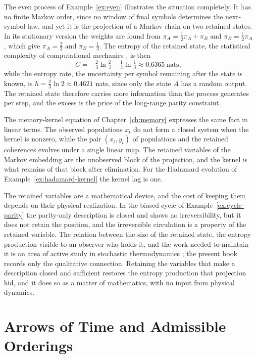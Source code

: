 \documentclass[11pt,oneside]{book}
\theoremstyle{definition}
\theoremstyle{remark}
\begin{document}
The even process of Example~\ref{ex:even} illustrates the situation completely. It has no finite Markov order, since no window of final symbols determines the next-symbol law, and yet it is the projection of a Markov chain on two retained states. In its stationary version the weights are found from $\pi_A=\tfrac12\pi_A+\pi_B$ and $\pi_B=\tfrac12\pi_A$, which give $\pi_A=\tfrac23$ and $\pi_B=\tfrac13$. The entropy of the retained state, the statistical complexity of computational mechanics \cite{crutchfield1989,shalizi2001}, is then
\[
C=-\tfrac23\ln\tfrac23-\tfrac13\ln\tfrac13\approx0.6365\ \text{nats},
\]
while the entropy rate, the uncertainty per symbol remaining after the state is known, is $h=\tfrac23\ln2\approx0.4621$ nats, since only the state $A$ has a random output. The retained state therefore carries more information than the process generates per step, and the excess is the price of the long-range parity constraint.

The memory-kernel equation of Chapter~\ref{ch:memory} expresses the same fact in linear terms. The observed populations $x_t$ do not form a closed system when the kernel is nonzero, while the pair $(x_t,y_t)$ of populations and the retained coherences evolves under a single linear map. The retained variables of the Markov embedding are the unobserved block of the projection, and the kernel is what remains of that block after elimination. For the Hadamard evolution of Example~\ref{ex:hadamard-kernel} the kernel lag is one.

The retained variables are a mathematical device, and the cost of keeping them depends on their physical realization. In the biased cycle of Example~\ref{ex:cycle-parity} the parity-only description is closed and shows no irreversibility, but it does not retain the position, and the irreversible circulation is a property of the retained variable. The relation between the size of the retained state, the entropy production visible to an observer who holds it, and the work needed to maintain it is an area of active study in stochastic thermodynamics \cite{seifert2012}; the present book records only the qualitative connection. Retaining the variables that make a description closed and sufficient restores the entropy production that projection hid, and it does so as a matter of mathematics, with no input from physical dynamics.

\chapter{Arrows of Time and Admissible Orderings}\label{ch:arrow}
\end{document}
